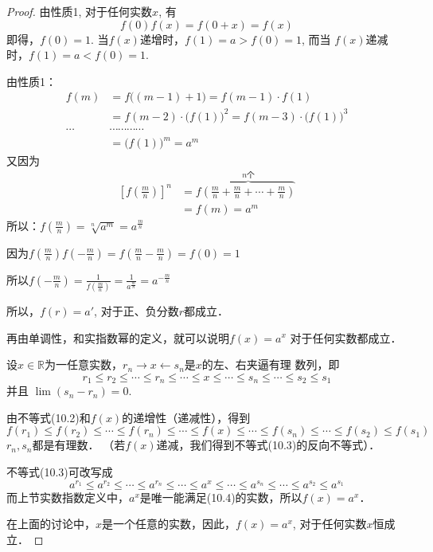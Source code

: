 \begin{proof}
由性质1, 对于任何实数$x$, 有
\[f(0)f(x)=f(0+x)=f(x)\]
即得，$f(0)=1$. 当$f(x)$递增时，$f(1)=a>f(0)=1$, 而当
$f(x)$递减时，$f(1)=a<f(0)=1$.

由性质1：
\[\begin{split}
  f(m)&=f\big((m-1)+1\big)=f(m-1)\cdot f(1)\\
  &=f(m-2)\cdot \big(f(1)\big)^2=f(m-3)\cdot \big(f(1)\big)^3\\
\cdots & \cdots \cdots \cdots \cdots \\
&=\big(f(1)\big)^m=a^m
\end{split}\]
又因为
\[\begin{split}
  \left[f\left(\frac{m}{n}\right)\right]^n&=f\overbrace{\left(\frac{m}{n}+\frac{m}{n}+\cdots +\frac{m}{n}\right)}^{n\text{个}}\\
  &=f(m)=a^m
\end{split}\]
所以：$f\left(\frac{m}{n}\right)=\sqrt[n]{a^m}=a^{\tfrac{m}{n}}$

因为$f\left(\frac{m}{n}\right)f\left(-\frac{m}{n}\right)=f\left(\frac{m}{n}-\frac{m}{n}\right)=f(0)=1$

所以$f\left(-\frac{m}{n}\right)=\frac{1}{f\left(\frac{m}{n}\right)}=\frac{1}{a^{\tfrac{m}{n}}}=a^{-\tfrac{m}{n}}$

所以，$f(r)=a'$, 对于正、负分数$r$都成立．

再由单调性，和实指数幂的定义，就可以说明$f(x)=a^x$
对于任何实数都成立．

设$x\in\mathbb{R}$为一任意实数，$r_n\to x\leftarrow s_n$是$x$的左、右夹逼有理
数列，即
\begin{equation}
  r_1\le r_2\le \cdots \le r_n\le \cdots \le x\le \cdots \le s_n\le \cdots \le s_2\le s_1
\end{equation}
并且 $\lim(s_n-r_n)=0$.

由不等式(10.2)和$f(x)$的递增性（递减性），得到
\begin{equation}
  f(r_1)\le f(r_2)\le \cdots \le f(r_n)\le \cdots \le f(x)\le \cdots \le f(s_n)\le \cdots \le f(s_2)\le f(s_1)
\end{equation}
$r_n,s_n$都是有理数．
（若$f(x)$递减，我们得到不等式(10.3)的反向不等式）．

不等式(10.3)可改写成
\begin{equation}
  a^{r_1}\le a^{r_2}\le \cdots \le a^{r_n}\le \cdots \le a^{x}\le \cdots \le a^{s_n}\le \cdots \le a^{s_2}\le a^{s_1}
\end{equation}
而上节实数指数定义中，$a^x$是唯一能满足(10.4)的实数，所以$f(x)=a^x$．

在上面的讨论中，$x$是一个任意的实数，因此，$f(x)=
a^x$, 对于任何实数$x$恒成立．
\end{proof}


